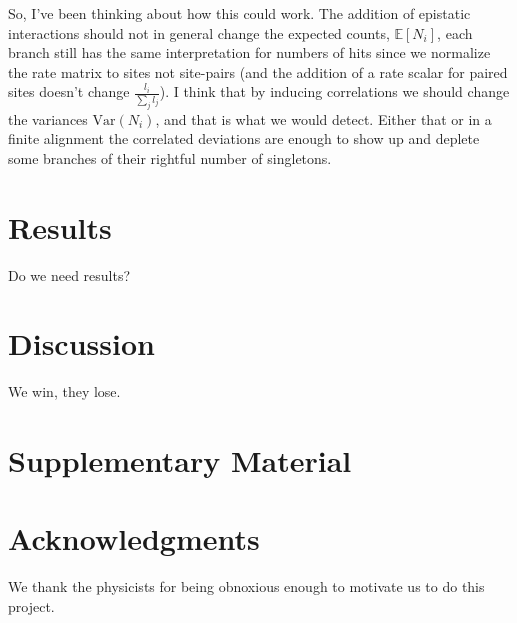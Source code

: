 \documentclass[11pt]{article}
\begin{document}
So, I've been thinking about how this could work.
The addition of epistatic interactions should not in general change the expected counts, $\mathbb{E}[N_i]$, each branch still has the same interpretation for numbers of hits since we normalize the rate matrix to sites not site-pairs (and the addition of a rate scalar for paired sites doesn't change $\frac{l_i}{\sum_j l_j}$).
I think that by inducing correlations we should change the variances $\text{Var}(N_i)$, and that is what we would detect.
Either that or in a finite alignment the correlated deviations are enough to show up and deplete some branches of their rightful number of singletons.



\section*{Results\label{sec:results}}

Do we need results?

\section*{Discussion\label{sec:discussion}}

We win, they lose.

\section*{Supplementary Material}



\section*{Acknowledgments}
We thank the physicists for being obnoxious enough to motivate us to do this project.



\end{document}
